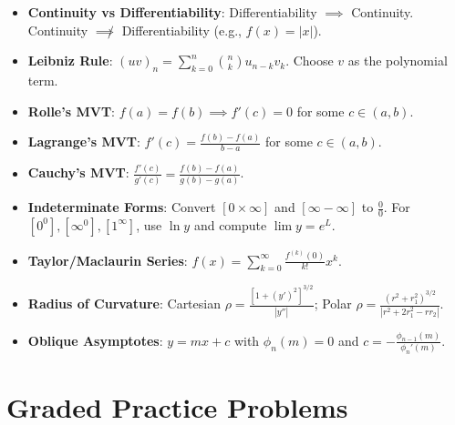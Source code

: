 \begin{quickrevision}
\begin{itemize}
    \item \textbf{Continuity vs Differentiability}: Differentiability $\implies$ Continuity. Continuity $\not\implies$ Differentiability (e.g., $f(x)=|x|$).
    \item \textbf{Leibniz Rule}: $(uv)_n = \sum_{k=0}^n \binom{n}{k} u_{n-k} v_k$. Choose $v$ as the polynomial term.
    \item \textbf{Rolle's MVT}: $f(a)=f(b) \implies f'(c)=0$ for some $c \in (a,b)$.
    \item \textbf{Lagrange's MVT}: $f'(c) = \frac{f(b)-f(a)}{b-a}$ for some $c \in (a,b)$.
    \item \textbf{Cauchy's MVT}: $\frac{f'(c)}{g'(c)} = \frac{f(b)-f(a)}{g(b)-g(a)}$.
    \item \textbf{Indeterminate Forms}: Convert ${[0 \times \infty]}$ and ${[\infty - \infty]}$ to $\frac{0}{0}$. For $[0^0], [\infty^0], [1^\infty]$, use $\ln y$ and compute $\lim y = e^L$.
    \item \textbf{Taylor/Maclaurin Series}: $f(x) = \sum_{k=0}^\infty \frac{f^{(k)}(0)}{k!} x^k$.
    \item \textbf{Radius of Curvature}: Cartesian $\rho = \frac{[1+(y')^2]^{3/2}}{|y''|}$; Polar $\rho = \frac{(r^2+r_1^2)^{3/2}}{|r^2+2r_1^2-rr_2|}$.
    \item \textbf{Oblique Asymptotes}: $y = mx+c$ with $\phi_n(m) = 0$ and $c = -\frac{\phi_{n-1}(m)}{\phi_n'(m)}$.
\end{itemize}
\end{quickrevision}

\section{Graded Practice Problems}

